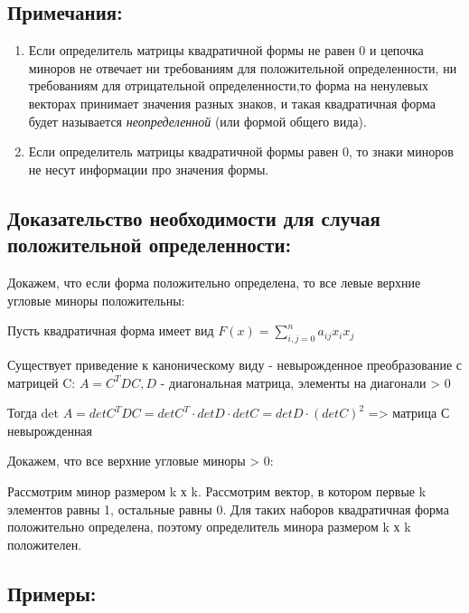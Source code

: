 \documentclass[12pt]{article}
\begin{document}
    \subsection{Примечания:}

    \begin{enumerate}
        \item Если определитель матрицы квадратичной формы не равен 0 и цепочка миноров не отвечает ни требованиям для положительной определенности, ни требованиям для отрицательной определенности,то форма на ненулевых векторах принимает значения разных знаков, и такая квадратичная форма будет называется  \textit{неопределенной} (или формой общего вида).
        \item Если определитель матрицы квадратичной формы равен 0, то знаки миноров не несут информации про значения формы.
    \end{enumerate}

    \subsection{Доказательство необходимости для случая положительной определенности:}

    Докажем, что если форма положительно определена, то все левые верхние угловые миноры положительны:

    Пусть квадратичная форма имеет вид $F(x) = \sum\limits_{i,j=0}^n a_{ij} x_{i} x_{j}$

    Существует приведение к каноническому виду - невырожденное преобразование с матрицей C:
$A = C^{T}DC, D$ - диагональная матрица, элементы на диагонали > 0

    Тогда det $A = det C^{T}DC = det C^{T} \cdot det D \cdot det C = det D \cdot (detC)^{2}$ => матрица С невырожденная

    Докажем, что все верхние угловые миноры > 0:

    Рассмотрим минор размером k х k. Рассмотрим вектор, в котором первые k элементов равны 1, остальные равны 0. Для таких наборов квадратичная форма положительно определена, поэтому определитель минора размером k х k положителен.

    \subsection{Примеры:}
\end{document}
